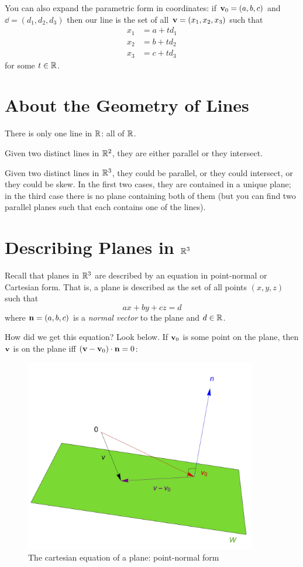 You can also expand the parametric form in coordinates:  if $\mathbf{v}_0 = (a,b,c)$ and $\dd = (d_1,d_2,d_3)$ then our line
is the set of all $\mathbf{v}=(x_1,x_2,x_3)$ such that 
\begin{align*}
x_1 &= a+ td_1\\
x_2 &= b+td_2\\
x_3 &= c+td_3
\end{align*}
for some $t\in \mathbb{R}$.

\section{About the Geometry of Lines}

There is only one line in $\mathbb{R}$:  all of $\mathbb{R}$.

Given two distinct lines in $\mathbb{R}^2$, they are either parallel or they intersect.

Given two distinct 
lines in $\mathbb{R}^3$, they could be parallel, or they could intersect,
or they could be skew.  In the first two cases, they are contained
in a unique plane; in the third case there is no plane containing
both of them (but you can find two parallel planes such that each
contains one of the lines).

\section{Describing Planes in \texorpdfstring{$\mathbb{R}^3$}{R3}}
Recall that planes in $\mathbb{R}^3$ are described by an equation in point-normal
 or  Cartesian form.  That is, a plane is described as 
the set of all points $(x,y,z)$ such that
$$
ax+by+cz = d
$$
where $\mathbf{n} = (a,b,c)$ is a \emph{normal vector} to the plane
and $d\in \mathbb{R}$.

How did we get this equation? Look below. If $\mathbf{v}_0$ is some point on the plane, then $\mathbf{v}$ is on the plane iff $(\mathbf{v} - \mathbf{v}_0) \cdot \mathbf{n} = 0$:  \begin{figure}
\begin{center}
\includegraphics[width=4in]{img/cartesianequationplane.jpg}
\end{center}

\caption{The cartesian equation of a plane: point-normal form}\label{cartesiannormalformplane}
\end{figure}

